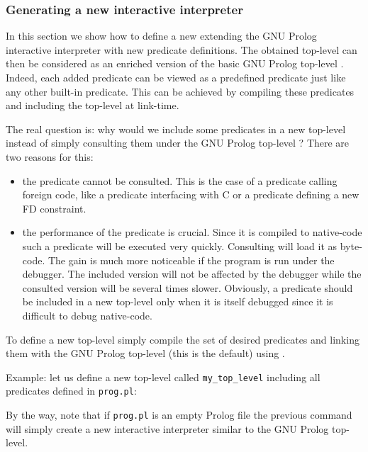 \subsubsection{Generating a new interactive interpreter}
\label{Generating-a-new-interactive-interpreter}
In this section we show how to define a new  extending the
GNU Prolog interactive interpreter with new predicate definitions. The
obtained top-level can then be considered as an enriched version of the basic
GNU Prolog top-level . Indeed, each
added predicate can be viewed as a predefined predicate just like any other
built-in predicate. This can be achieved by compiling these predicates and
including the top-level at link-time.

The real question is: why would we include some predicates in a new
top-level instead of simply consulting them under the GNU Prolog top-level ?
There are two reasons for this:

\begin{itemize}

\item the predicate cannot be consulted. This is the case of a predicate
calling foreign code, like a predicate interfacing with C  or a predicate defining a new FD constraint.

\item the performance of the predicate is crucial. Since it is compiled to
native-code such a predicate will be executed very quickly. Consulting will
load it as byte-code. The gain is much more noticeable if the program is run
under the debugger. The included version will not be affected by the
debugger while the consulted version will be several times slower.
Obviously, a predicate should be included in a new top-level only when it is
itself debugged since it is difficult to debug native-code.

\end{itemize}

To define a new top-level simply compile the set of desired predicates and
linking them with the GNU Prolog top-level (this is the default) using
 .

Example: let us define a new top-level called \texttt{my\_top\_level}
including all predicates defined in \texttt{prog.pl}:


By the way, note that if \texttt{prog.pl} is an empty Prolog file the
previous command will simply create a new interactive interpreter similar to
the GNU Prolog top-level.

